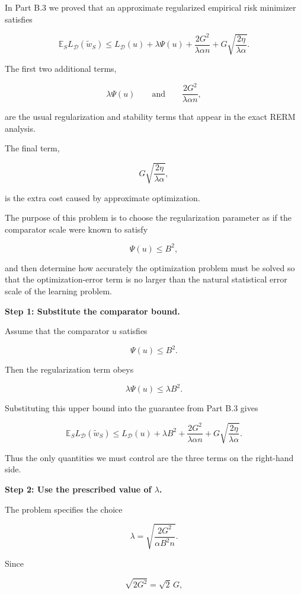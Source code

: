 \documentclass[11pt]{article}
\newcommand{\E}{\mathbb{E}}
\begin{document}
\begin{enumerate}
\begin{solutionbox}
In Part B.3 we proved that an approximate regularized empirical risk minimizer satisfies

\[
\E_S L_{\mathcal D}(\widetilde w_S)
\le
L_{\mathcal D}(u)
+
\lambda\Psi(u)
+
\frac{2G^2}{\lambda\alpha n}
+
G\sqrt{\frac{2\eta}{\lambda\alpha}}.
\]

The first two additional terms,

\[
\lambda\Psi(u)
\qquad\text{and}\qquad
\frac{2G^2}{\lambda\alpha n},
\]

are the usual regularization and stability terms that appear in the exact RERM analysis.

The final term,

\[
G\sqrt{\frac{2\eta}{\lambda\alpha}},
\]

is the extra cost caused by approximate optimization.

The purpose of this problem is to choose the regularization parameter as if the comparator scale were known to satisfy

\[
\Psi(u)\le B^2,
\]

and then determine how accurately the optimization problem must be solved so that the optimization-error term is no larger than the natural statistical error scale of the learning problem.

\medskip

\textbf{Step 1: Substitute the comparator bound.}

Assume that the comparator \(u\) satisfies

\[
\Psi(u)\le B^2.
\]

Then the regularization term obeys

\[
\lambda\Psi(u)
\le
\lambda B^2.
\]

Substituting this upper bound into the guarantee from Part B.3 gives

\[
\E_S L_{\mathcal D}(\widetilde w_S)
\le
L_{\mathcal D}(u)
+
\lambda B^2
+
\frac{2G^2}{\lambda\alpha n}
+
G\sqrt{\frac{2\eta}{\lambda\alpha}}.
\]

Thus the only quantities we must control are the three terms on the right-hand side.

\medskip

\textbf{Step 2: Use the prescribed value of \(\lambda\).}

The problem specifies the choice

\[
\lambda
=
\sqrt{
\frac{2G^2}
     {\alpha B^2 n}
}.
\]

Since

\[
\sqrt{2G^2}
=
\sqrt2\,G,
\]


\end{solutionbox}
\end{enumerate}
\end{document}
